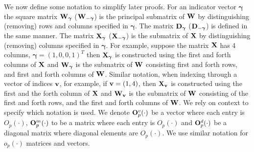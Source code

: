 \documentclass[11pt]{article}
\newtheorem{Main Result}{Main Result}
\def\vectorfontone{\bf}
\def\vectorfonttwo{\boldsymbol}
\def\vu{{\vectorfontone u}}                      %
\def\vv{{\vectorfontone v}}                      %
\def\vgamma{{\vectorfonttwo \gamma}}             %
\def\matrixfontone{\bf}
\def\mD{{\matrixfontone D}}                      %
\def\mO{{\matrixfontone O}}                      %
\def\mW{{\matrixfontone W}}                      %
\def\mX{{\matrixfontone X}}                      %
\begin{document}
We now define some notation to simplify later proofs. For an indicator vector
$\vgamma$ the square matrix $\mW_{\vgamma}$ ($\mW_{-\vgamma}$) is the principal
submatrix of $\mW$ by distinguishing (removing) rows and columns specified in
$\vgamma$. The matrix $\mD_{\vgamma}$ ($\mD_{-\vgamma}$) is defined in the same
manner. The matrix $\mX_{\vgamma}$ ($\mX_{-\vgamma}$) is the submatrix of
$\mX$ by distinguishing (removing) columns specified in $\vgamma$. For example,
suppose the matrix $\mX$ has 4 columns, $\vgamma=(1,0,0,1)^T$ then
$\mX_{\vgamma}$ is constructed using the first and forth
columns of $\mX$ and $\mW_{\vgamma}$ is the submatrix of $\mW$ consisting
first and forth rows, and first and forth columns of $\mW$. Similar
notation, when indexing through a vector of indices $\vv$, for example, if ${\bf{v}}=(1,4)$,
then $\mX_{\bf{v}}$ is constructed using the first and the forth column of $\mX$ and
$\mW_{\bf{v}}$ is the submatrix of $\mW$ consisting of the first and forth rows,
and the first and forth columns of $\mW$. We rely on context to specify which notation
is used. We denote $\mO_p^v(\cdot)$ be a vector where each entry is $O_p(\cdot)$,
$\mO_p^m(\cdot)$ to be a matrix where each entry is $O_p(\cdot)$ and $\mO_p^d(\cdot)$
be a diagonal matrix where diagonal elements are $O_p(\cdot)$. We use similar
notation for $o_p(\cdot)$ matrices and vectors.
\end{document}
